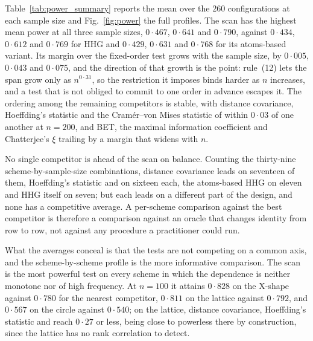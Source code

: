 Table~\ref{tab:power_summary} reports the mean over the $260$ configurations at
each sample size and Fig.~\ref{fig:power} the full profiles. The scan has the
highest mean power at all three sample sizes, $0{\cdot}467$, $0{\cdot}641$ and
$0{\cdot}790$, against $0{\cdot}434$, $0{\cdot}612$ and $0{\cdot}769$ for HHG
and $0{\cdot}429$, $0{\cdot}631$ and $0{\cdot}768$ for its atoms-based variant.
Its margin over the fixed-order test grows with the sample size, by
$0{\cdot}005$, $0{\cdot}043$ and $0{\cdot}075$, and the direction of that growth
is the point: rule~(12) lets the span grow only as $n^{0{\cdot}31}$, so the
restriction it imposes binds harder as $n$ increases, and a test that is not
obliged to commit to one order in advance escapes it. The ordering among the
remaining competitors is stable, with distance covariance, Hoeffding's statistic
and the Cram\'er--von Mises statistic of \citet{Gen19} within $0{\cdot}03$ of one
another at $n = 200$, and BET, the maximal information coefficient and
Chatterjee's $\xi$ trailing by a margin that widens with $n$.

No single competitor is ahead of the scan on balance. Counting the thirty-nine
scheme-by-sample-size combinations, distance covariance leads on seventeen of
them, Hoeffding's statistic and \citet{Gen19} on sixteen each, the atoms-based
HHG on eleven and HHG itself on seven; but each leads on a different part of the
design, and none has a competitive average. A per-scheme comparison against the
best competitor is therefore a comparison against an oracle that changes
identity from row to row, not against any procedure a practitioner could run.

What the averages conceal is that the tests are not competing on a common axis,
and the scheme-by-scheme profile is the more informative comparison. The scan is
the most powerful test on every scheme in which the dependence is neither
monotone nor of high frequency. At $n = 100$ it attains $0{\cdot}828$ on the
X-shape against $0{\cdot}780$ for the nearest competitor, $0{\cdot}811$ on the
lattice against $0{\cdot}792$, and $0{\cdot}567$ on the circle against
$0{\cdot}540$; on the lattice, distance covariance, Hoeffding's statistic and
\citet{Gen19} reach $0{\cdot}27$ or less, being close to powerless there by
construction, since the lattice has no rank correlation to detect.

